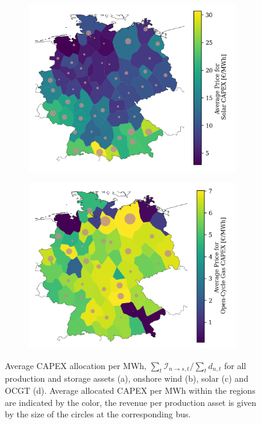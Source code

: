 \documentclass[11pt,twocolumn]{article}
\newcommand{\demand}[1][n]{d_{#1,t}}
\newcommand{\allocatecapex}[1][n \rightarrow s,t]{\mathcal{I}_{#1}}
\begin{document}
\begin{figure}
\begin{subfigure}[c]{.49\linewidth}
    \end{subfigure}
    \begin{subfigure}[c]{.49\linewidth}
        \includegraphics[width=\linewidth]{de50/maps_price/by_carrier/solar_one_port_investment_cost}
        \label{fig:solar_capex}
    \end{subfigure}
    \begin{subfigure}[c]{.49\linewidth}
        \includegraphics[width=\linewidth]{de50/maps_price/by_carrier/OCGT_one_port_investment_cost}
        \label{fig:ocgt_capex}
    \end{subfigure}
    \caption{Average \ac{CAPEX} allocation per MWh, $\sum_t \allocatecapex / \sum_t \demand$  for all production and storage assets (a), onshore wind (b), solar (c) and OCGT (d). Average allocated CAPEX per MWh within the regions are indicated by the color, the revenue per production asset is given by the size of the circles at the corresponding bus.}
    \label{fig:capex_price}
\end{figure}
\end{document}
